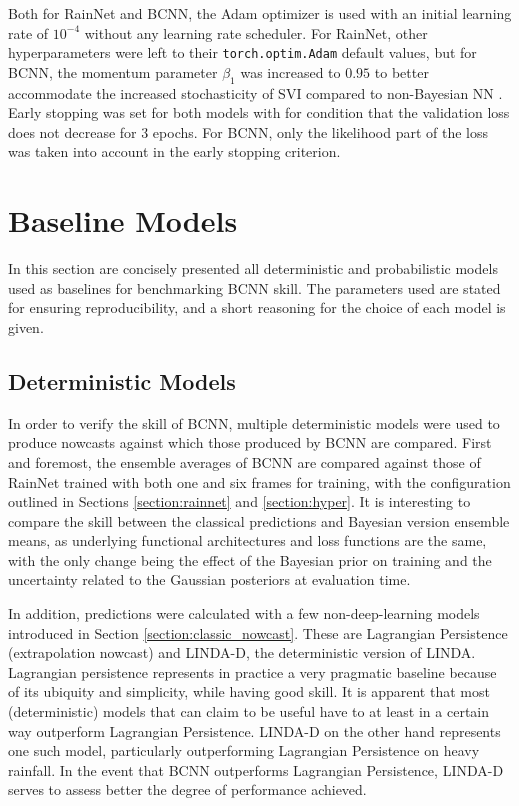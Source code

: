  Both for RainNet and BCNN, the Adam optimizer is used with an initial learning rate of $10^{-4}$ without any learning rate scheduler. For RainNet, other hyperparameters were left to their \texttt{torch.optim.Adam} default values, but for BCNN, the momentum parameter $\beta_1$ was increased to $0.95$ to better accommodate the increased stochasticity of SVI compared to non-Bayesian NN \cite{noauthor_svi_nodate}. Early stopping was set for both models with for condition that the validation loss does not decrease for 3 epochs. For BCNN, only the likelihood part of the loss was taken into account in the early stopping criterion. 


\section{Baseline Models}

In this section are concisely presented all deterministic and probabilistic models used as baselines for benchmarking BCNN skill. The parameters used are stated for ensuring reproducibility, and a short reasoning for the choice of each model is given.

\subsection{Deterministic Models}
\label{section:det_model}

In order to verify the skill of BCNN, multiple deterministic models were used to produce nowcasts against which those produced by BCNN are compared. First and foremost, the ensemble averages of BCNN are compared against those of RainNet trained with both one and six frames for training, with the configuration outlined in Sections \ref{section:rainnet} and \ref{section:hyper}. It is interesting to compare the skill between the classical predictions and Bayesian version ensemble means, as underlying functional architectures and loss functions are the same, with the only change being the effect of the Bayesian prior on training and the uncertainty related to the Gaussian posteriors at evaluation time. 

In addition, predictions were calculated with a few non-deep-learning models introduced in Section \ref{section:classic_nowcast}. These are Lagrangian Persistence (extrapolation nowcast) and LINDA-D, the deterministic version of LINDA. Lagrangian persistence represents in practice 
a very pragmatic baseline because of its ubiquity and simplicity, while having good skill. It is apparent that most (deterministic) models that can claim to be useful have to at least in a certain way outperform Lagrangian Persistence. LINDA-D on the other hand represents one such model, particularly outperforming Lagrangian Persistence on heavy rainfall. In the event that BCNN outperforms Lagrangian Persistence, LINDA-D serves to assess better the degree of performance achieved. 



